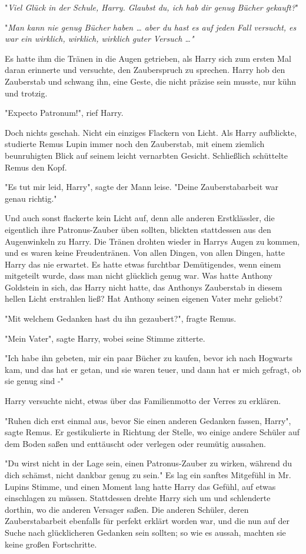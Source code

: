 {"\emph{Viel Glück in der Schule, Harry. Glaubst du, ich hab dir genug Bücher gekauft?}"

"\emph{Man kann nie genug Bücher haben … aber du hast es auf jeden Fall versucht, es war ein wirklich, wirklich, wirklich guter Versuch …"}

Es hatte ihm die Tränen in die Augen getrieben, als Harry sich zum ersten Mal daran erinnerte und versuchte, den Zauberspruch zu sprechen. Harry hob den Zauberstab und schwang ihn, eine Geste, die nicht präzise sein musste, nur kühn und trotzig.

"Expecto Patronum!", rief Harry.

Doch nichts geschah. Nicht ein einziges Flackern von Licht. Als Harry aufblickte, studierte Remus Lupin immer noch den Zauberstab, mit einem ziemlich beunruhigten Blick auf seinem leicht vernarbten Gesicht. Schließlich schüttelte Remus den Kopf.

"Es tut mir leid, Harry", sagte der Mann leise. "Deine Zauberstabarbeit war genau richtig."

Und auch sonst flackerte kein Licht auf, denn alle anderen Erstklässler, die eigentlich ihre Patronus-Zauber üben sollten, blickten stattdessen aus den Augenwinkeln zu Harry. Die Tränen drohten wieder in Harrys Augen zu kommen, und es waren keine Freudentränen. Von allen Dingen, von allen Dingen, hatte Harry das nie erwartet. Es hatte etwas furchtbar Demütigendes, wenn einem mitgeteilt wurde, dass man nicht glücklich genug war. Was hatte Anthony Goldstein in sich, das Harry nicht hatte, das Anthonys Zauberstab in diesem hellen Licht erstrahlen ließ? Hat Anthony seinen eigenen Vater mehr geliebt?

"Mit welchem Gedanken hast du ihn gezaubert?", fragte Remus.

"Mein Vater", sagte Harry, wobei seine Stimme zitterte.

"Ich habe ihn gebeten, mir ein paar Bücher zu kaufen, bevor ich nach Hogwarts kam, und das hat er getan, und sie waren teuer, und dann hat er mich gefragt, ob sie genug sind -"

Harry versuchte nicht, etwas über das Familienmotto der Verres zu erklären.

"Ruhen dich erst einmal aus, bevor Sie einen anderen Gedanken fassen, Harry", sagte Remus. Er gestikulierte in Richtung der Stelle, wo einige andere Schüler auf dem Boden saßen und enttäuscht oder verlegen oder reumütig aussahen.

"Du wirst nicht in der Lage sein, einen Patronus-Zauber zu wirken, während du dich schämst, nicht dankbar genug zu sein." Es lag ein sanftes Mitgefühl in Mr. Lupins Stimme, und einen Moment lang hatte Harry das Gefühl, auf etwas einschlagen zu müssen. Stattdessen drehte Harry sich um und schlenderte dorthin, wo die anderen Versager saßen. Die anderen Schüler, deren Zauberstabarbeit ebenfalls für perfekt erklärt worden war, und die nun auf der Suche nach glücklicheren Gedanken sein sollten; so wie es aussah, machten sie keine großen Fortschritte.

}
